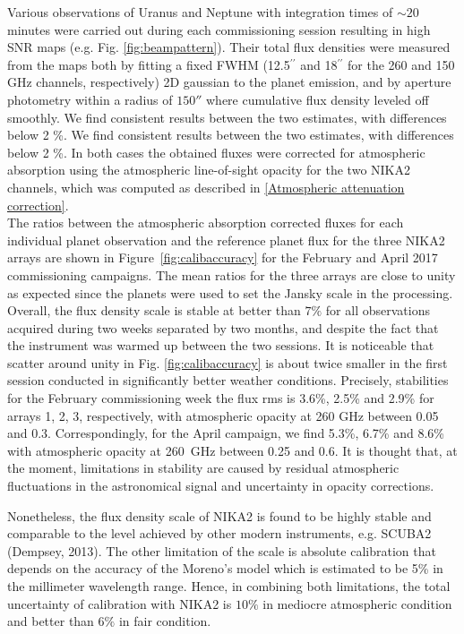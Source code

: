 \documentclass[]{aa} %
\begin{document}
Various observations of Uranus and Neptune with integration times of $\sim 20$ minutes were carried out during each commissioning session resulting in high SNR maps (e.g. Fig. \ref{fig:beampattern}). Their total flux densities were measured from the maps both by fitting a fixed FWHM (12.5$^{\prime \prime}$ and 18$^{\prime \prime}$ for the 260 and 150 GHz channels, respectively) 2D gaussian to the planet emission, and by aperture photometry within a radius of  $150''$ where cumulative flux density leveled off smoothly.  We find consistent results between the two estimates, with differences below 2 \%. We find consistent results between the two estimates, with differences below 2 \%. In both cases the obtained fluxes were corrected for atmospheric absorption using the atmospheric line-of-sight opacity for the two NIKA2 channels, which was computed as described in \ref{Atmospheric attenuation correction}. \\

The ratios between the atmospheric absorption corrected fluxes for each individual planet observation and the reference planet flux for the three NIKA2 arrays are shown in Figure~\ref{fig:calibaccuracy} for the February and April 2017 commissioning campaigns.  The mean ratios for the three arrays are close to unity as expected since the planets were used to set the Jansky scale in the processing. Overall, the flux density scale is stable at better than $7\%$ for all observations acquired during two weeks  separated by two months, and despite the fact that the instrument was warmed up between the two sessions. It is noticeable that scatter around unity in Fig. \ref{fig:calibaccuracy}
is about twice smaller in the first session conducted in significantly better weather conditions.
Precisely, stabilities for the February commissioning week the flux rms is 3.6\%, 2.5\% and 2.9\% for arrays 1, 2, 3, respectively, with atmospheric opacity at 260 GHz between 0.05 and 0.3.
Correspondingly, for the April campaign, we find  5.3\%, 6.7\% and 8.6\%  with atmospheric opacity at 260~GHz between 0.25 and 0.6. It is thought that, at the moment, limitations in stability are caused by residual atmospheric fluctuations in the astronomical signal and uncertainty in opacity corrections. 

Nonetheless, the flux density scale of NIKA2 is found to be highly stable and comparable to the level achieved
by other modern instruments, e.g. SCUBA2 (Dempsey, 2013). The other limitation of the scale is absolute calibration that depends on the accuracy of the Moreno's model which is estimated to be 5\% in the millimeter wavelength range. Hence, in combining both limitations, the total uncertainty of calibration with NIKA2 is $10\%$ in mediocre atmospheric condition and better than $6\%$ in fair condition. 
\end{document}
